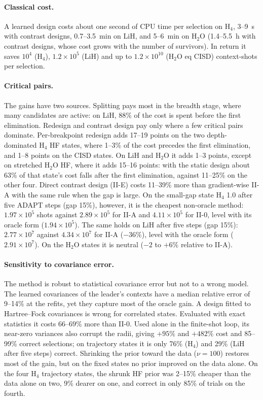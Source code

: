\documentclass[aps,pra,reprint,superscriptaddress,nofootinbib]{revtex4-2}
\begin{document}
\paragraph{Classical cost.} A learned design costs about one second of CPU time per selection on H$_4$, 3--9~s with contrast designs, 0.7--3.5~min on LiH, and 5--6~min on H$_2$O (1.4--5.5~h with contrast designs, whose cost grows with the number of survivors). In return it saves $10^4$ (H$_4$), $1.2\times10^5$ (LiH) and up to $1.2\times10^{10}$ (H$_2$O eq CISD) context-shots per selection.

\paragraph{Critical pairs.} The gains have two sources. Splitting pays most in the breadth stage, where many candidates are active: on LiH, 88\% of the cost is spent before the first elimination. Redesign and contrast design pay only where a few critical pairs dominate. Per-breakpoint redesign adds 17--19 points on the two depth-dominated H$_4$ HF states, where 1--3\% of the cost precedes the first elimination, and 1--8 points on the CISD states. On LiH and H$_2$O it adds 1--3 points, except on stretched H$_2$O HF, where it adds 15--16 points: with the static design about 63\% of that state's cost falls after the first elimination, against 11--25\% on the other four. Direct contrast design (II-E) costs 11--39\% more than gradient-wise II-A with the same rule when the gap is large. On the small-gap state H$_4$ 1.0 after five ADAPT steps (gap 15\%), however, it is the cheapest non-oracle method: $1.97\times10^5$ shots against $2.89\times10^5$ for II-A and $4.11\times10^5$ for II-0, level with its oracle form ($1.94\times10^5$). The same holds on LiH after five steps (gap 15\%): $2.77\times10^7$ against $4.34\times10^7$ for II-A ($-36\%$), level with the oracle form ($2.91\times10^7$). On the H$_2$O states it is neutral ($-2$ to $+6\%$ relative to II-A).

\paragraph{Sensitivity to covariance error.} The method is robust to statistical covariance error but not to a wrong model. The learned covariances of the leader's contexts have a median relative error of 9--14\% at the refits, yet they capture most of the oracle gain. A design fitted to Hartree--Fock covariances is wrong for correlated states. Evaluated with exact statistics it costs $66$--$69\%$ more than II-0. Used alone in the finite-shot loop, its near-zero variances also corrupt the radii, giving $+95\%$ and $+482\%$ cost and 85--99\% correct selections; on trajectory states it is only 76\% (H$_4$) and 29\% (LiH after five steps) correct. Shrinking the prior toward the data ($\nu=100$) restores most of the gain, but on the fixed states no prior improved on the data alone. On the four H$_4$ trajectory states, the shrunk HF prior was 2--15\% cheaper than the data alone on two, 9\% dearer on one, and correct in only 85\% of trials on the fourth.
\end{document}
